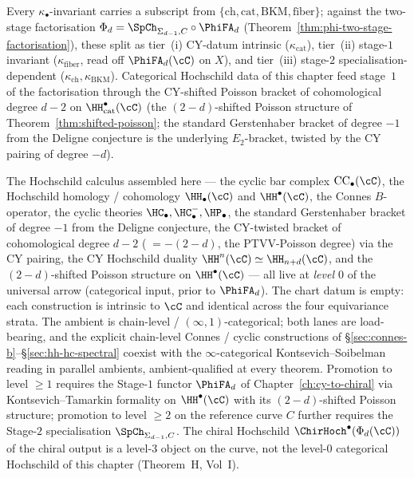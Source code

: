 \begin{remark}
\label{rem:hochschild-kappa-convention}
Every $\kappa_\bullet$-invariant carries a subscript from $\{\mathrm{ch}, \mathrm{cat}, \mathrm{BKM}, \mathrm{fiber}\}$; against the two-stage factorisation $\Phi_d = \SpCh_{\Sigma_{d-1},C} \circ \PhiFA_d$ (Theorem~\ref{thm:phi-two-stage-factorisation}), these split as tier~(i) CY-datum intrinsic ($\kappa_{\mathrm{cat}}$), tier~(ii) stage-$1$ invariant ($\kappa_{\mathrm{fiber}}$, read off $\PhiFA_d(\cC)$ on $X$), and tier~(iii) stage-$2$ specialisation-dependent ($\kappa_{\mathrm{ch}}, \kappa_{\mathrm{BKM}}$). Categorical Hochschild data of this chapter feed stage~$1$ of the factorisation through the CY-shifted Poisson bracket of cohomological degree $d-2$ on $\HH^\bullet_{\mathrm{cat}}(\cC)$ (the $(2-d)$-shifted Poisson structure of Theorem~\ref{thm:shifted-poisson}; the standard Gerstenhaber bracket of degree $-1$ from the Deligne conjecture is the underlying $E_2$-bracket, twisted by the CY pairing of degree $-d$).
\end{remark}

\begin{remark}
\label{rem:hochschild-three-axis-scope}
The Hochschild calculus assembled here — the cyclic bar complex
$\mathrm{CC}_\bullet(\cC)$, the Hochschild homology / cohomology
$\HH_\bullet(\cC)$ and $\HH^\bullet(\cC)$, the Connes $B$-operator,
the cyclic theories $\HC_\bullet, \HC^-_\bullet, \HP_\bullet$, the
standard Gerstenhaber bracket of degree $-1$ from the Deligne
conjecture, the CY-twisted bracket of cohomological degree $d-2$
($\;= -(2-d)$, the PTVV-Poisson degree) via the CY pairing, the
CY Hochschild duality $\HH^n(\cC) \simeq \HH_{n+d}(\cC)$, and the
$(2-d)$-shifted Poisson structure on $\HH^\bullet(\cC)$ — all live
at \emph{level $0$} of
the universal arrow (categorical input, prior to $\PhiFA_d$). The
chart datum is empty: each construction is intrinsic to $\cC$ and
identical across the four equivariance strata. The ambient is
chain-level / $(\infty,1)$-categorical; both lanes are load-bearing,
and the explicit chain-level Connes / cyclic constructions of
\S\ref{sec:connes-b}--\S\ref{sec:hh-hc-spectral} coexist with the
$\infty$-categorical Kontsevich--Soibelman reading in parallel
ambients, ambient-qualified at every theorem. Promotion to level $\geq 1$ requires the
Stage-$1$ functor $\PhiFA_d$ of Chapter~\ref{ch:cy-to-chiral} via
Kontsevich--Tamarkin formality on $\HH^\bullet(\cC)$ with its
$(2-d)$-shifted Poisson structure; promotion to level $\geq 2$ on
the reference curve $C$ further requires the Stage-$2$
specialisation $\SpCh_{\Sigma_{d-1}, C}$. The chiral Hochschild
$\ChirHoch^\bullet(\Phi_d(\cC))$ of the chiral output is a level-$3$
object on the curve, not the level-$0$ categorical Hochschild of
this chapter (Theorem~H, Vol~I).
\end{remark}

